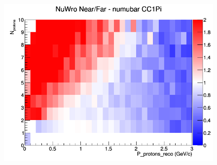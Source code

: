 \begin{figure}[h]
\endminipage
{}
\includegraphics[width=\linewidth]{eff_N_P/GAr/protons/ratios/CC1Pi_NuWro_numubar_NF_N_P.png}
\endminipage
\newline
\end{figure}
\clearpage


